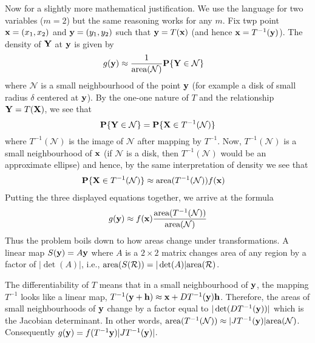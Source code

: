 \documentclass[preprint,  11pt]{amsart}
\def\h{{\bf h}}
\def\X{{\bf X}}
\def\Y{{\bf Y}}
\begin{document}
Now for a slightly more mathematical justification. We use the language for two variables ($m=2$) but the same reasoning works for any $m$. Fix twp point $\mathbf{x}=(x_{1},x_{2})$ and $\mathbf{y}=(y_{1},y_{2})$ such that $\mathbf{y}=T(\mathbf{x})$ (and hence $\mathbf{x}=T^{-1}(\mathbf{y})$). The density of $\Y$ at $\mathbf{y}$ is given by 
\begin{align*} 
g(\y)&\approx \frac{1}{\mb{area}(\mathcal N)}\P\{\Y\in \mathcal N\}
\end{align*}
where $\mathcal N$ is a small neighbourhood of the point $\mathbf{y}$ (for example a disk of small radius $\delta$ centered at $\mathbf{y}$). By the one-one nature of $T$ and the relationship $\Y=T(\X)$, we see that $$\P\{\Y\in \mathcal N\}=\P\{\X\in T^{-1}(\mathcal N)\}$$ where $T^{-1}(\mathcal N)$ is the image of $\mathcal N$ after mapping by $T^{-1}$.  Now, $T^{-1}(\mathcal N)$ is a small neighbourhood of $\mathbf{x}$ (if $\mathcal N$ is a disk, then $T^{-1}(\mathcal N)$ would be an approximate ellipse) and hence, by the same interpretation of density we see that
\begin{align*} 
\P\{\X\in T^{-1}(\mathcal N)\}&\approx \mb{area}(T^{-1}(\mathcal N))f(\x)
\end{align*}
Putting the three displayed equations together, we arrive at the formula
$$
g(\mathbf{y})\approx f(\mathbf{x})\frac{\mbox{area}(T^{-1}(\mathcal N))}{\mbox{area}(\mathcal N)}
$$
Thus the problem boils down to how areas change under transformations. A linear map $S(\mathbf{y})=A\mathbf{y}$ where $A$ is a $2\times 2$ matrix changes area of any region by a factor of $|\det(A)|$, i.e., $\mbox{area}(S(\mathcal R))=|\det(A)|\mbox{area}(\mathcal R)$. 

The differentiability of $T$ means that in a small neighbourhood of $\mathbf{y}$, the mapping $T^{-1}$ looks like a linear map, $T^{-1}(\y+\mathbf h)\approx \x+DT^{-1}(\y)\h$. Therefore, the areas of small neighbourhoods of $\mathbf{y}$ change by a factor equal to $|\det(DT^{-1}(\mathbf{y}))|$ which is the Jacobian determinant. In other words, $\mbox{area}(T^{-1}(\mathcal N))\approx |JT^{-1}(\mathbf{y})|\mbox{area}(\mathcal N)$. Consequently $g(\mathbf{y})=f(T^{-1}\mathbf{y})|JT^{-1}(\mathbf{y})|$.
\end{document}
